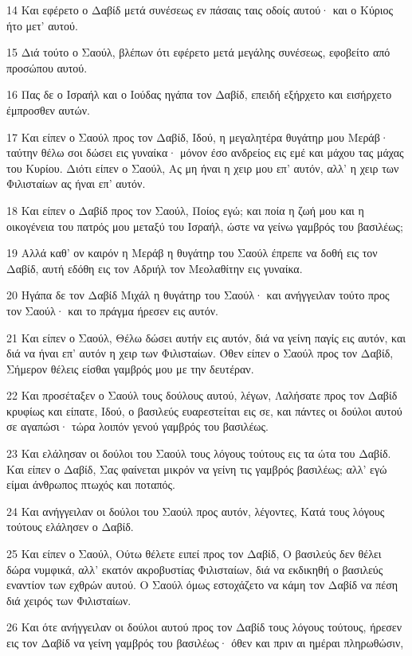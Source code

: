 \par 14 Και εφέρετο ο Δαβίδ μετά συνέσεως εν πάσαις ταις οδοίς αυτού· και ο Κύριος ήτο μετ' αυτού.
\par 15 Διά τούτο ο Σαούλ, βλέπων ότι εφέρετο μετά μεγάλης συνέσεως, εφοβείτο από προσώπου αυτού.
\par 16 Πας δε ο Ισραήλ και ο Ιούδας ηγάπα τον Δαβίδ, επειδή εξήρχετο και εισήρχετο έμπροσθεν αυτών.
\par 17 Και είπεν ο Σαούλ προς τον Δαβίδ, Ιδού, η μεγαλητέρα θυγάτηρ μου Μεράβ· ταύτην θέλω σοι δώσει εις γυναίκα· μόνον έσο ανδρείος εις εμέ και μάχου τας μάχας του Κυρίου. Διότι είπεν ο Σαούλ, Ας μη ήναι η χειρ μου επ' αυτόν, αλλ' η χειρ των Φιλισταίων ας ήναι επ' αυτόν.
\par 18 Και είπεν ο Δαβίδ προς τον Σαούλ, Ποίος εγώ; και ποία η ζωή μου και η οικογένεια του πατρός μου μεταξύ του Ισραήλ, ώστε να γείνω γαμβρός του βασιλέως;
\par 19 Αλλά καθ' ον καιρόν η Μεράβ η θυγάτηρ του Σαούλ έπρεπε να δοθή εις τον Δαβίδ, αυτή εδόθη εις τον Αδριήλ τον Μεολαθίτην εις γυναίκα.
\par 20 Ηγάπα δε τον Δαβίδ Μιχάλ η θυγάτηρ του Σαούλ· και ανήγγειλαν τούτο προς τον Σαούλ· και το πράγμα ήρεσεν εις αυτόν.
\par 21 Και είπεν ο Σαούλ, Θέλω δώσει αυτήν εις αυτόν, διά να γείνη παγίς εις αυτόν, και διά να ήναι επ' αυτόν η χειρ των Φιλισταίων. Όθεν είπεν ο Σαούλ προς τον Δαβίδ, Σήμερον θέλεις είσθαι γαμβρός μου με την δευτέραν.
\par 22 Και προσέταξεν ο Σαούλ τους δούλους αυτού, λέγων, Λαλήσατε προς τον Δαβίδ κρυφίως και είπατε, Ιδού, ο βασιλεύς ευαρεστείται εις σε, και πάντες οι δούλοι αυτού σε αγαπώσι· τώρα λοιπόν γενού γαμβρός του βασιλέως.
\par 23 Και ελάλησαν οι δούλοι του Σαούλ τους λόγους τούτους εις τα ώτα του Δαβίδ. Και είπεν ο Δαβίδ, Σας φαίνεται μικρόν να γείνη τις γαμβρός βασιλέως; αλλ' εγώ είμαι άνθρωπος πτωχός και ποταπός.
\par 24 Και ανήγγειλαν οι δούλοι του Σαούλ προς αυτόν, λέγοντες, Κατά τους λόγους τούτους ελάλησεν ο Δαβίδ.
\par 25 Και είπεν ο Σαούλ, Ούτω θέλετε ειπεί προς τον Δαβίδ, Ο βασιλεύς δεν θέλει δώρα νυμφικά, αλλ' εκατόν ακροβυστίας Φιλισταίων, διά να εκδικηθή ο βασιλεύς εναντίον των εχθρών αυτού. Ο Σαούλ όμως εστοχάζετο να κάμη τον Δαβίδ να πέση διά χειρός των Φιλισταίων.
\par 26 Και ότε ανήγγειλαν οι δούλοι αυτού προς τον Δαβίδ τους λόγους τούτους, ήρεσεν εις τον Δαβίδ να γείνη γαμβρός του βασιλέως· όθεν και πριν αι ημέραι πληρωθώσιν,
